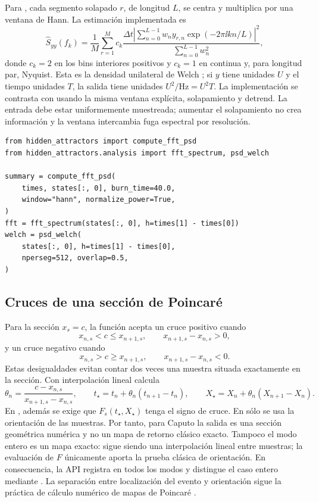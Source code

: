 Para , cada segmento solapado \(r\), de longitud \(L\), se
centra y multiplica por una ventana de Hann. La estimación implementada es
\[
 \widehat S_{yy}(f_k)=
 \frac1{M}\sum_{r=1}^{M}
 c_k\frac{\Delta t\left|\sum_{n=0}^{L-1}
 w_n y_{r,n}\exp(-2\pi\ii kn/L)\right|^2}
 {\sum_{n=0}^{L-1}w_n^2},
\]
donde \(c_k=2\) en los bins interiores positivos y \(c_k=1\) en continua y,
para longitud par, Nyquist. Esta es la densidad unilateral de Welch
\cite{Welch1967}; si \(y\) tiene unidades \(U\) y el tiempo unidades \(T\), la
salida tiene unidades \(U^2/\mathrm{Hz}=U^2T\). La implementación se contrasta
con  usando la misma ventana explícita, solapamiento
y detrend. La entrada debe estar uniformemente muestreada; aumentar el
solapamiento no crea información y la ventana intercambia fuga espectral por
resolución.

\begin{verbatim}
from hidden_attractors import compute_fft_psd
from hidden_attractors.analysis import fft_spectrum, psd_welch

summary = compute_fft_psd(
    times, states[:, 0], burn_time=40.0,
    window="hann", normalize_power=True,
)
fft = fft_spectrum(states[:, 0], h=times[1] - times[0])
welch = psd_welch(
    states[:, 0], h=times[1] - times[0],
    nperseg=512, overlap=0.5,
)
\end{verbatim}

\subsection{Cruces de una sección de Poincaré}

\par\smallskip\noindent
Para la sección \(x_s=c\), la función
 acepta un cruce positivo cuando
\[
 x_{n,s}<c\leq x_{n+1,s},
 \qquad x_{n+1,s}-x_{n,s}>0,
\]
y un cruce negativo cuando
\[
 x_{n,s}>c\geq x_{n+1,s},
 \qquad x_{n+1,s}-x_{n,s}<0.
\]
Estas desigualdades evitan contar dos veces una muestra situada exactamente
en la sección. Con interpolación lineal calcula
\[
 \theta_n=\frac{c-x_{n,s}}{x_{n+1,s}-x_{n,s}},\qquad
 t_\star=t_n+\theta_n(t_{n+1}-t_n),\qquad
 X_\star=X_n+\theta_n(X_{n+1}-X_n).
\]
En , además se exige que
\(F_s(t_\star,X_\star)\) tenga el signo de cruce. En
 sólo se usa la orientación
de las muestras. Por tanto, para Caputo la salida es una sección geométrica
numérica y no un mapa de retorno clásico exacto. Tampoco el modo entero es un
mapa exacto: sigue siendo una interpolación lineal entre muestras; la
evaluación de \(F\) únicamente aporta la prueba clásica de orientación. En
consecuencia, la API registra  en todos los
modos y distingue el caso entero mediante
. La separación entre
localización del evento y orientación sigue la práctica de cálculo numérico de
mapas de Poincaré \cite{Henon1982}.

